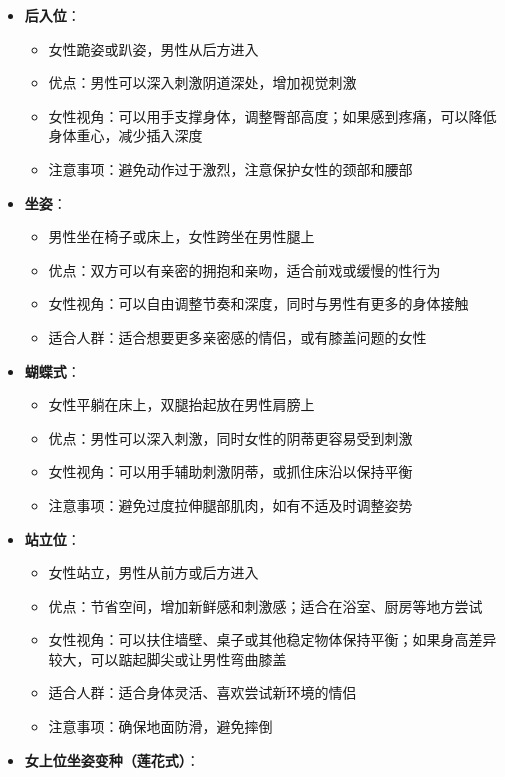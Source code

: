\documentclass[12pt,UTF8]{ctexbook}
\begin{document}
\begin{itemize}
\begin{itemize}
  \item \textbf{后入位}：
    \begin{itemize}
    \item 女性跪姿或趴姿，男性从后方进入
    \item 优点：男性可以深入刺激阴道深处，增加视觉刺激
    \item 女性视角：可以用手支撑身体，调整臀部高度；如果感到疼痛，可以降低身体重心，减少插入深度
    \item 注意事项：避免动作过于激烈，注意保护女性的颈部和腰部
    \end{itemize}
  \item \textbf{坐姿}：
    \begin{itemize}
    \item 男性坐在椅子或床上，女性跨坐在男性腿上
    \item 优点：双方可以有亲密的拥抱和亲吻，适合前戏或缓慢的性行为
    \item 女性视角：可以自由调整节奏和深度，同时与男性有更多的身体接触
    \item 适合人群：适合想要更多亲密感的情侣，或有膝盖问题的女性
    \end{itemize}
  \item \textbf{蝴蝶式}：
    \begin{itemize}
    \item 女性平躺在床上，双腿抬起放在男性肩膀上
    \item 优点：男性可以深入刺激，同时女性的阴蒂更容易受到刺激
    \item 女性视角：可以用手辅助刺激阴蒂，或抓住床沿以保持平衡
    \item 注意事项：避免过度拉伸腿部肌肉，如有不适及时调整姿势
    \end{itemize}
  \item \textbf{站立位}：
    \begin{itemize}
    \item 女性站立，男性从前方或后方进入
    \item 优点：节省空间，增加新鲜感和刺激感；适合在浴室、厨房等地方尝试
    \item 女性视角：可以扶住墙壁、桌子或其他稳定物体保持平衡；如果身高差异较大，可以踮起脚尖或让男性弯曲膝盖
    \item 适合人群：适合身体灵活、喜欢尝试新环境的情侣
    \item 注意事项：确保地面防滑，避免摔倒
    \end{itemize}
  \item \textbf{女上位坐姿变种（莲花式）}：
    \begin{itemize}

\end{itemize}
\end{itemize}
\end{itemize}
\end{document}
